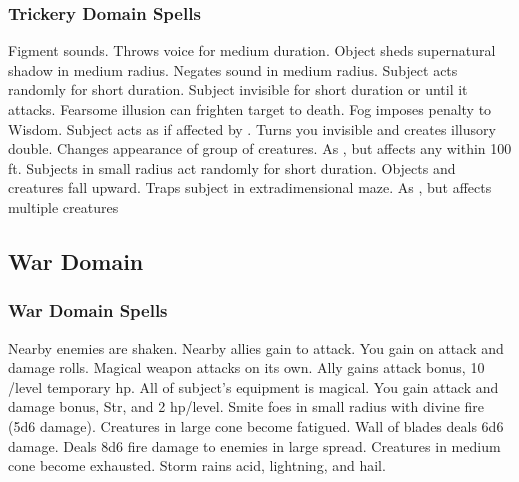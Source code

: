\subsubsection{Trickery Domain Spells}
\begin{spelllist}
 Figment sounds.
 Throws voice for medium duration.
 Object sheds supernatural shadow in medium radius.
 Negates sound in medium radius.
 Subject acts randomly for short duration.
 Subject invisible for short duration or until it attacks.
\spellhead[4]{}
 Fearsome illusion can frighten target to death.
 Fog imposes  penalty to Wisdom.
 Subject acts as if affected by .
 Turns you invisible and creates illusory double.
 Changes appearance of group of creatures.
 As , but affects any within 100 ft.
\spellhead[7]{}
 Subjects in small radius act randomly for short duration.
 Objects and creatures fall upward.
 Traps subject in extradimensional maze.
 As , but affects multiple creatures
\end{spelllist}

\subsection{War Domain}
\subsubsection{War Domain Spells}
\begin{spelllist}
 Nearby enemies are shaken.
 Nearby allies gain  to attack.
 You gain  on attack and damage rolls.
 Magical weapon attacks on its own.
 Ally gains  attack bonus, 10 /level temporary hp.
\spellhead[3]{}
 All of subject's equipment is magical.
 You gain attack and damage bonus,  Str, and 2 hp/level.
 Smite foes in small radius with divine fire (5d6 damage).
 Creatures in large cone become fatigued.
 Wall of blades deals 6d6 damage.
\spellhead[6]{}
\spellhead[7]{}
\spellhead[7]{}
 Deals 8d6 fire damage to enemies in large spread.
 Creatures in medium cone become exhausted.  
\spellhead[9]{}
 Storm rains acid, lightning, and hail.
\end{spelllist}

